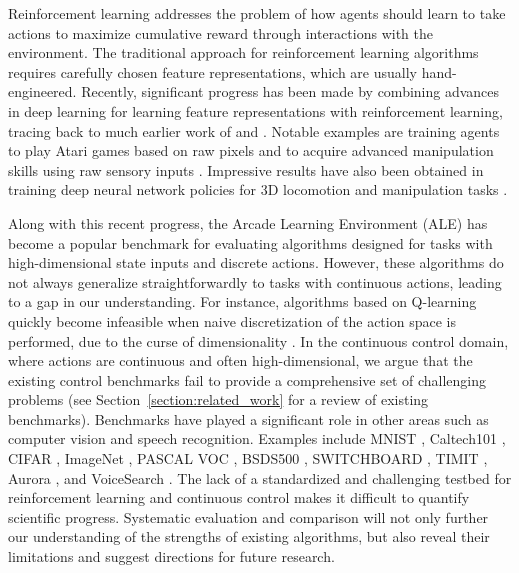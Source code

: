 \documentclass{article}
\begin{document}
Reinforcement learning addresses the problem of how agents should learn to take actions to maximize cumulative reward through interactions with the environment. The traditional approach for reinforcement learning algorithms requires carefully chosen feature representations, which are usually hand-engineered. 
Recently, significant progress has been made by combining advances in deep learning for learning feature representations \cite{Krizhevsky12, Hinton12} with reinforcement learning, tracing back to much earlier work of \citet{Tesauro95TDGammon} and \citet{Bertsekas95Neuro}. Notable examples are training agents to play Atari games based on raw pixels \cite{NIPS2014_5421, Mnih15, Schulman15TRPO}
and to acquire advanced manipulation skills using raw sensory inputs \cite{Levine15, Lillicrap15, Watter15E2C}. Impressive results have also been obtained in training deep neural network policies for 3D locomotion and manipulation tasks \cite{Schulman15TRPO, Schulman15GAE, Heess15}. 









Along with this recent progress, the Arcade Learning Environment (ALE) \cite{Bellemare13ALE} has become a popular benchmark for evaluating algorithms designed for tasks with high-dimensional state inputs and discrete actions. However, these algorithms do not always generalize straightforwardly to tasks with continuous actions, leading to a gap in our understanding. For instance, algorithms based on Q-learning quickly become infeasible when naive discretization of the action space is performed, due to the curse of dimensionality \cite{Bellman57, Lillicrap15}. In the continuous control domain, where actions are continuous and often high-dimensional, we argue that the existing control benchmarks fail to provide a comprehensive set of challenging problems (see Section~\ref{section:related_work} for a review of existing benchmarks).
Benchmarks have played a significant role in other areas such as computer vision and speech recognition. Examples include MNIST \cite{lecun1998mnist}, Caltech101 \cite{fei2006one}, CIFAR \cite{krizhevsky2009learning}, ImageNet \cite{Deng09ImageNet}, PASCAL VOC \cite{everingham2010pascal}, BSDS500 \cite{MartinFTM01}, SWITCHBOARD \cite{sb}, TIMIT \cite{garofolo1993darpa}, Aurora \cite{hirsch2000aurora}, and VoiceSearch \cite{Dong07VoiceSearch}. The lack of a standardized and challenging testbed for reinforcement learning and continuous control makes it difficult to quantify scientific progress. Systematic evaluation and comparison will not only further our understanding of the strengths of existing algorithms, but also reveal their limitations and suggest directions for future research.
\end{document}
